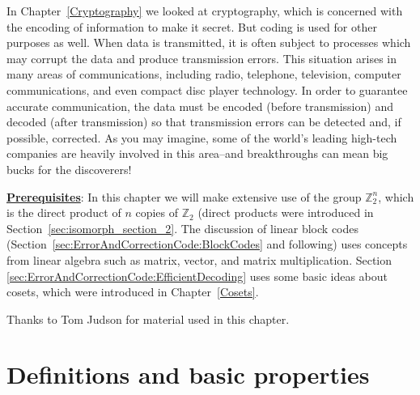 
In Chapter~\ref{Cryptography} we looked at  cryptography, which is concerned with the encoding of  information to make it secret. But coding is used for other purposes as well.  When data is transmitted, it is often subject to processes which may corrupt the data and produce transmission errors. This situation
arises in many areas of communications, including radio, telephone, television, computer communications, and even compact disc player technology. In order to guarantee accurate communication, the data must be encoded (before transmission) and decoded (after transmission) so that transmission errors can be detected and, if possible, corrected. As you may imagine,  some of the world's leading high-tech companies are heavily involved in this area--and breakthroughs can mean big bucks for the discoverers!
\medskip

\noindent
\underline{\bf Prerequisites}: In this chapter we will make extensive use of the group $\mathbb{Z}^{n}_{2}$, which is the direct product of $n$ copies of $\mathbb{Z}_{2}$ (direct products were introduced in Section~\ref{sec:isomorph_section_2}.  
The discussion of linear block codes (Section~\ref{sec:ErrorAndCorrectionCode:BlockCodes} and following) uses concepts from linear algebra such as matrix, vector, and matrix multiplication. Section \ref{sec:ErrorAndCorrectionCode:EfficientDecoding} uses some basic ideas about cosets, which were introduced in  Chapter~\ref{Cosets}.  
\bigskip

Thanks to Tom Judson for material used in this chapter.
  
 
\section{Definitions and basic properties}
\label{sec:ErrorAndCorrectionCode:Definitions}
  
